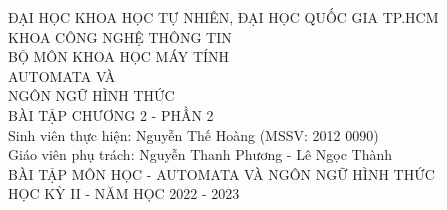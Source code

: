 \documentclass[12pt, a4paper]{article}
\begin{document}
	

	\begin{titlepage}
		\centering
		\large
		ĐẠI HỌC KHOA HỌC TỰ NHIÊN, ĐẠI HỌC QUỐC GIA TP.HCM\\[.1in]
		KHOA CÔNG NGHỆ THÔNG TIN\\BỘ MÔN KHOA HỌC MÁY TÍNH\\
		\vfill
		\huge AUTOMATA VÀ\\NGÔN NGỮ HÌNH THỨC\\[.1in]
		\LARGE BÀI TẬP CHƯƠNG 2 - PHẦN 2\\
		\vfill
		\RaggedRight
		\large
		Sinh viên thực hiện: Nguyễn Thế Hoàng (MSSV: 2012 0090)\\[.1in]
		Giáo viên phụ trách: Nguyễn Thanh Phương - Lê Ngọc Thành\\[.2in]
		\Centering
		BÀI TẬP MÔN HỌC - AUTOMATA VÀ NGÔN NGỮ HÌNH THỨC\\[.1in]
		HỌC KỲ II - NĂM HỌC 2022 - 2023
	\end{titlepage}
	
	\newpage	
	
	
\end{document}
